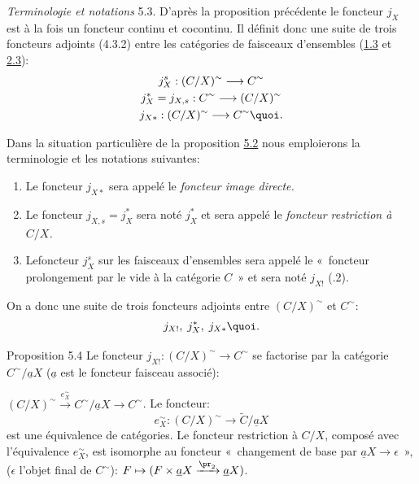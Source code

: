 \documentclass[10pt]{../fichiers-configuration-latex/smfart}
\begin{document}
\noindent \emph{Terminologie et notations} 5.3. D'après la
proposition précédente le foncteur $j_X$ est à la fois un
foncteur continu et cocontinu. Il définit donc une suite de
trois foncteurs adjoints (4.3.2) entre les catégories de
faisceaux d'ensembles (\hyperref[III.prop1.3]{1.3} et \hyperref[III.prop2.3]{2.3}):
\begin{gather*}
j^s_X:(C/X)^{\sim}\longrightarrow
C^{\sim}\\
j^{\ast}_X=j_{X,s}:C^{\sim}\longrightarrow
(C/X)^{\sim}\\
j_{X\ast}:(C/X)^{\sim}\longrightarrow C^{\sim}{\quoi}.
\end{gather*}

Dans la situation particulière de la proposition \hyperref[III.prop5.2]{5.2}
nous emploierons la terminologie et les notations suivantes:
\begin{enumerate}
\renewcommand{\labelenumi}{\theenumi)}
\item Le foncteur $j_{X\ast}$ sera appelé le \emph{foncteur image
directe.}

\item Le foncteur $j_{X,s}=j^{\ast}_X$ sera noté $j^{\ast}_X$ et
sera appelé le \emph{foncteur restriction à $C/X$.}

\item Le\pageoriginale foncteur $j^s_X$ sur les faisceaux d'ensembles
sera appelé le « foncteur prolongement par le vide à la
catégorie $C$ » et sera noté $j_{X!}$ (.2).
\end{enumerate}

On a donc une suite de trois foncteurs adjoints entre $(C/X)^{\sim}$
et $C^{\sim}$:
$$
j_{X!},\; j^{\ast}_X,\; j_{X\ast}{\quoi}.
$$

\begin{enonce*}{Proposition 5.4}
Le foncteur $j_{X!}:(C/X)^{\sim}\rightarrow C^{\sim}$ se factorise
par la catégorie $C^{\sim}/\underline{a}X$ ($\underline{a}$ est le
foncteur faisceau associé):

$(C/X)^{\sim}\xrightarrow{e^{\sim}_X} C^{\sim}/\underline{a}X\rightarrow
C^{\sim}$. Le foncteur:
$$
e^{\sim}_X:(C/X)^{\sim}\longrightarrow \widetilde{C}/\underline{a}X
$$
est une équivalence de catégories. Le foncteur restriction
à $C/X$, composé avec l'équivalence $e^{\sim}_X$, est
isomorphe au foncteur « changement de base par
$\underline{a}X\rightarrow \epsilon$ », ($\epsilon$ l'objet final de
$C^{\sim}$): $F\mapsto (F\times
\underline{a}X\xrightarrow{\pr_2}\underline{a}X)$.
\end{enonce*}
\end{document}
